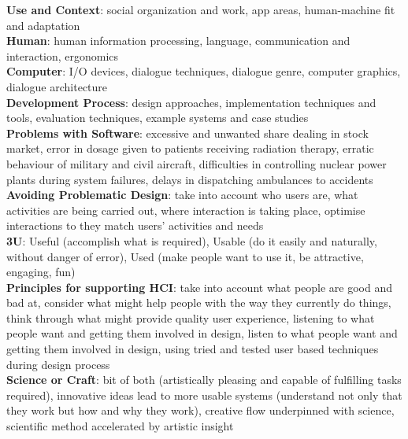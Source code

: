 \documentclass[a4paper]{article}
\begin{document}
\begin{multicols}{2}
        \textbf{Use and Context}: social organization and work, app areas, human-machine fit and adaptation\\
        \textbf{Human}: human information processing, language, communication and interaction, ergonomics\\
        \textbf{Computer}: I/O devices, dialogue techniques, dialogue genre, computer graphics, dialogue architecture\\
        \textbf{Development Process}: design approaches, implementation techniques and tools, evaluation techniques, example systems and case studies\\
        \textbf{Problems with Software}: excessive and unwanted share dealing in stock market, error in dosage given to patients receiving radiation therapy, erratic behaviour of military and civil aircraft, difficulties in controlling nuclear power plants during system failures, delays in dispatching ambulances to accidents\\
        \textbf{Avoiding Problematic Design}: take into account who users are, what activities are being carried out, where interaction is taking place, optimise interactions to they match users' activities and needs\\
        \textbf{3U}: Useful (accomplish what is required), Usable (do it easily and naturally, without danger of error), Used (make people want to use it, be attractive, engaging, fun)\\
        \textbf{Principles for supporting HCI}: take into account what people are good and bad at, consider what might help people with the way they currently do things, think through what might provide quality user experience, listening to what people want and getting them involved in design, listen to what people want and getting them involved in design, using tried and tested user based techniques during design process\\
        \textbf{Science or Craft}: bit of both (artistically pleasing and capable of fulfilling tasks required), innovative ideas lead to more usable systems (understand not only that they work but how and why they work), creative flow underpinned with science, scientific method accelerated by artistic insight\\
    \end{multicols}
    
\end{document}
